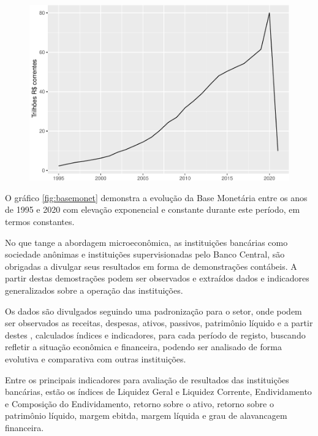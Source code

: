 \documentclass[12pt,12pt,openright,oneside,a4paper,chapter=TITLE,section=TITLE,subsection=TITLE,subsubsection=TITLE english,french,spanish,portugues,sumario=tradicional]{abntex2}
\begin{document}
\begin{figure}

\begin{center}\includegraphics{12-exportedfigures/money-1} \end{center}
\label{fig:basemonet}
\end{figure}

O gráfico \autoref{fig:basemonet} demonstra a evolução da Base Monetária entre os anos de 1995 e 2020 com elevação exponencial e constante durante este período, em termos constantes.

No que tange a abordagem microeconômica, as instituições bancárias como sociedade anônimas e instituições supervisionadas pelo Banco Central, são obrigadas a divulgar seus resultados em forma de demonstrações contábeis. A partir destas demostrações podem ser observados e extraídos dados e indicadores generalizados sobre a operação das instituições.

Os dados são divulgados seguindo uma padronização para o setor, onde podem ser observados as receitas, despesas, ativos, passivos, patrimônio líquido e a partir destes , calculados índices e indicadores, para cada período de registo, buscando refletir a situação econômica e financeira, podendo ser analisado de forma evolutiva e comparativa com outras instituições.

Entre os principais indicadores para avaliação de resultados das instituições bancárias, estão os índices de Liquidez Geral e Liquidez Corrente, Endividamento e Composição do Endividamento, retorno sobre o ativo, retorno sobre o patrimônio líquido, margem ebitda, margem líquida e grau de alavancagem financeira.
\end{document}
